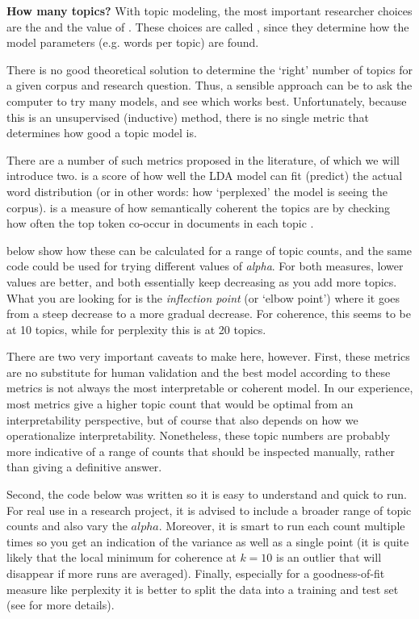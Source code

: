 
\begin{feature}
  \textbf{How many topics?}
  With topic modeling, the most important researcher choices are the  and the value of .
  These choices are called , since they determine how the model parameters (e.g. words per topic) are found.

  There is no good theoretical solution to determine the `right' number of topics for a given corpus and research question.
  Thus, a sensible approach can be to ask the computer to try many models, and see which works best.
  Unfortunately, because this is an unsupervised (inductive) method,
  there is no single metric that determines how good a topic model is.

  There are a number of such metrics proposed in the literature, of which we will introduce two.
   is a score of how well the LDA model can fit (predict) the actual word distribution
  (or in other words: how `perplexed' the model is seeing the corpus).
   is a measure of how semantically coherent the topics are by checking how often the top token co-occur in documents in each topic \citep{mimno11}.

   below show how these can be calculated for a range of topic counts, and the same code could be used for trying different values of \emph{alpha}.
  For both measures, lower values are better, and both essentially keep decreasing as you add more topics.
  What you are looking for is the \emph{inflection point} (or `elbow point') where it goes from a steep decrease to a more gradual decrease.
  For coherence, this seems to be at 10 topics, while for perplexity this is at 20 topics.

  There are two very important caveats to make here, however.
  First, these metrics are no substitute for human validation and the best model according to these metrics is not always the most interpretable or coherent model.
  In our experience, most metrics give a higher topic count that would be optimal from an interpretability perspective, but of course that also depends on how we operationalize interpretability.
  Nonetheless, these topic numbers are probably more indicative of a range of counts that should be inspected manually, rather than giving a definitive answer.

  Second, the code below was written so it is easy to understand and quick to run.
  For real use in a research project, it is advised to include a broader range of topic counts and also vary the $alpha$.
  Moreover, it is smart to run each count multiple times so you get an indication of the variance as well as a single point
  (it is quite likely that the local minimum for coherence at $k=10$ is an outlier that will disappear if more runs are averaged).
  Finally, especially for a goodness-of-fit measure like perplexity it is better to split the data into a training and test set
  (see  for more details).

\end{feature}

